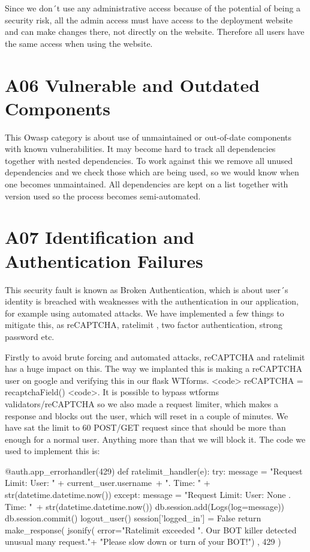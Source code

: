 Since we don´t use any administrative access because of the potential of being a security risk, all the admin access must have access to the deployment website and can make changes there, not directly on the website. Therefore all users have the same access when using the website.

\section{A06 Vulnerable and Outdated Components}

This Owasp category is about use of unmaintained or out-of-date components with known vulnerabilities. It may become hard to track all dependencies together with nested dependencies.
To work against this we remove all unused dependencies and we check those which are being used, so we would know when one becomes unmaintained. All dependencies are kept on a list together with version used so the process becomes semi-automated.

\section{A07 Identification and Authentication Failures}

This security fault is known as Broken Authentication, which is about user´s identity is breached with weaknesses with the authentication in our application, for example using automated attacks. We have implemented a few things to mitigate this, as reCAPTCHA, ratelimit , two factor authentication, strong password etc.   

Firstly to avoid brute forcing and automated attacks, reCAPTCHA and ratelimit has a huge impact on this. The way we implanted this is making a reCAPTCHA user on google and verifying this in our flask WTforms. <code> reCAPTCHA = recaptchaField() <code>. It is possible to bypass wtforms validators/reCAPTCHA so we also made a request limiter, which makes a response and blocks out the user, which will reset in a couple of minutes. We have sat the limit to 60 POST/GET request since that should be more than enough for a normal user. Anything more than that we will block it. The code we used to implement this is:

\begin{python}
@auth.app_errorhandler(429)
def ratelimit_handler(e):
    try:
        message = "Request Limit: User: " + current_user.username\
                  + ". Time: " + str(datetime.datetime.now())
    except:
        message = "Request Limit: User: None . Time: "\
                  + str(datetime.datetime.now())
    db.session.add(Logs(log=message))
    db.session.commit()
    logout_user()
    session['logged_in'] = False
    return make_response(
        jsonify(
            error="Ratelimit exceeded %
                  ". Our BOT killer detected unusual many request."+
                  "Please slow down or turn of your BOT!")
        , 429
    )
\end{python}

